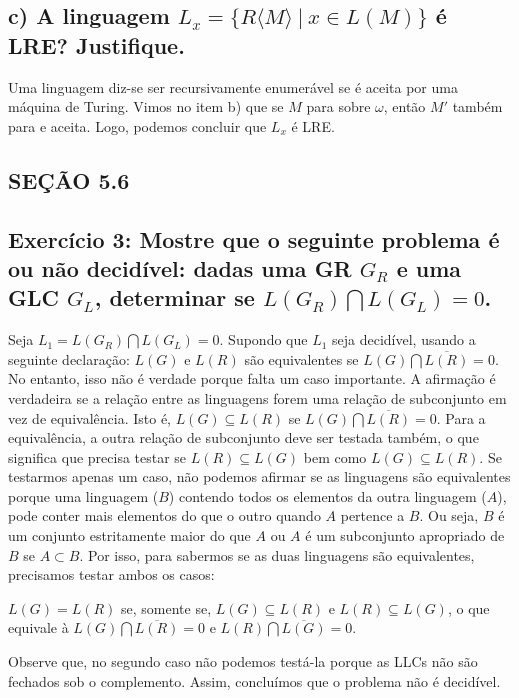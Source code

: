 \subsection*{c) A linguagem $L_x=\{R\langle M \rangle ~|~ x \in L(M)\}$ é LRE? Justifique.}

Uma linguagem diz-se ser recursivamente enumerável se é aceita por uma máquina de Turing. Vimos no item b) que se $M$ para sobre $\omega$, então $M'$ também para e aceita. Logo, podemos concluir que $L_x$ é LRE.




\subsection*{SEÇÃO 5.6}
\subsection*{Exercício 3: Mostre que o seguinte problema é ou não decidível: dadas uma GR $G_R$ e uma GLC $G_L$, determinar se $L(G_R) \bigcap L(G_L)=0$.}

Seja $L_1 = L(G_R) \bigcap L(G_L)=0$. Supondo que $L_1$ seja decidível, usando a seguinte declaração: $L(G)$ e $L(R)$ são equivalentes se $L(G) \bigcap \overline{L(R)} = 0$. No entanto, isso não é verdade porque falta um caso importante. A afirmação é verdadeira se a relação entre as linguagens forem uma relação de subconjunto em vez de equivalência. Isto é, $L(G) \subseteq L(R)$ se $L(G) \bigcap \overline{L(R)} = 0$. Para a equivalência, a outra relação de subconjunto deve ser testada também, o que significa que precisa testar se $L(R) \subseteq L(G)$ bem como $L(G) \subseteq L(R)$. Se testarmos apenas um caso, não podemos afirmar se as linguagens são equivalentes porque uma linguagem ($B$) contendo todos os elementos da outra linguagem ($A$), pode conter mais elementos do que o outro quando $A$ pertence a $B$. Ou seja, $B$ é um conjunto estritamente maior do que $A$ ou $A$ é um subconjunto apropriado de $B$ se $A \subset B$. Por isso, para sabermos se as duas linguagens são equivalentes, precisamos testar ambos os casos: 

$L(G) = L(R)$ se, somente se, $L(G) \subseteq L(R)$ e $L(R) \subseteq L(G)$, o que equivale à $L(G) \bigcap \overline{L(R)} = 0$ e $L(R) \bigcap \overline{L(G)} = 0$. 

Observe que, no segundo caso não podemos testá-la porque as LLCs não são fechados sob o complemento. Assim, concluímos que o problema não é decidível.

